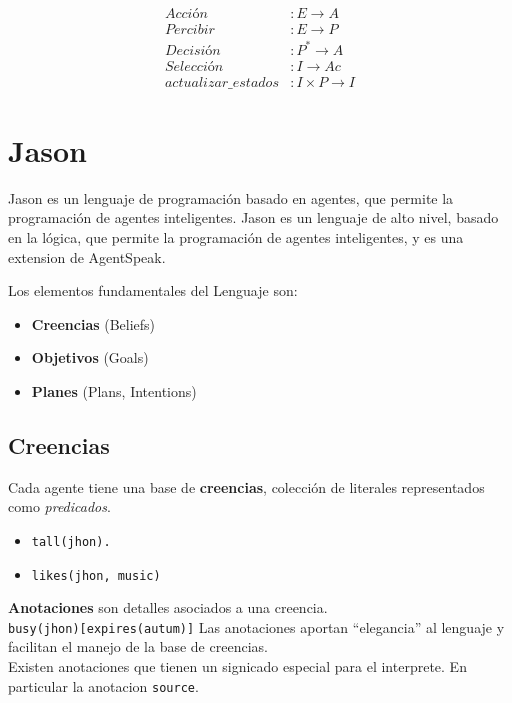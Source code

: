 \begin{align}
   \textit{Acción} & : E \rightarrow A \\
   \textit{Percibir} & : E \rightarrow P\\
   \textit{Decisión} & : P^* \rightarrow A\\
   \textit{Selección} & : I \rightarrow Ac \\
   \textit{actualizar\_estados} & : I \times P \rightarrow I
\end{align}

\section{Jason}

Jason es un lenguaje de programación basado en agentes, que permite la programación de agentes inteligentes. Jason es un lenguaje de alto nivel, basado en la lógica, que permite la programación de agentes inteligentes, y es una extension de AgentSpeak.

{Los elementos fundamentales del Lenguaje son:\ns
\begin{itemize}
	\item \textbf{Creencias} (Beliefs)
	\item \textbf{Objetivos} (Goals)
	\item \textbf{Planes} (Plans, Intentions)
\end{itemize} }


\subsection{Creencias}
{Cada agente tiene una base de \textbf{creencias}, colección de literales representados como \textit{predicados}.\ns
\begin{itemize}
	\item \lstinline|tall(jhon).|
	\item \lstinline|likes(jhon, music)|
\end{itemize}}
\textbf{Anotaciones} son detalles asociados a una creencia.\\\lstinline|busy(jhon)[expires(autum)]|
Las anotaciones aportan ``elegancia'' al lenguaje y facilitan el manejo de la base de creencias.\\
Existen anotaciones que tienen un signicado especial para el
interprete. En particular la anotacion \lstinline|source|.

